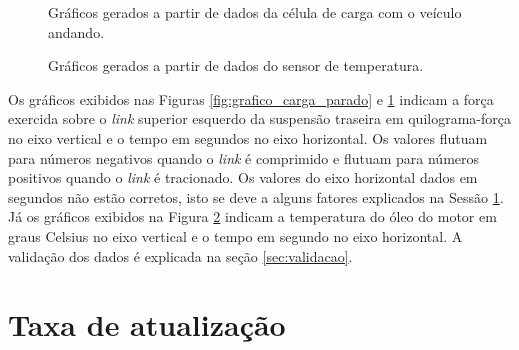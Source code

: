 \begin{figure}[!htb]
	\center
	\caption{Gráficos gerados a partir de dados da célula de carga com o veículo andando.}
	\qquad
	\qquad
	\qquad
	\label{fig:grafico_carga_andando}
\end{figure}


 \begin{figure}[!htb]
	\center
	\caption{Gráficos gerados a partir de dados do sensor de temperatura.}
	\qquad
	\label{fig:grafico_temperatura}
\end{figure}

Os gráficos exibidos nas Figuras \ref{fig:grafico_carga_parado} e \ref{fig:grafico_carga_andando} indicam a força exercida sobre o \textit{link} superior esquerdo da suspensão traseira em quilograma-força no eixo vertical e o tempo em segundos no eixo horizontal. Os valores flutuam para números negativos quando o \textit{link} é comprimido e flutuam para números positivos quando o \textit{link} é tracionado. Os valores do eixo horizontal dados em segundos não estão corretos, isto se deve a alguns fatores explicados na Sessão \ref{sec:taxa}. Já os gráficos exibidos na Figura \ref{fig:grafico_temperatura} indicam a temperatura do óleo do motor em graus Celsius no eixo vertical e o tempo em segundo no eixo horizontal. A validação dos dados é explicada na seção \ref{sec:validacao}. 

\section{Taxa de atualização}
\label{sec:taxa}


